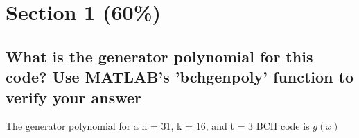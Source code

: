 \documentclass[a4paper]{report}
\begin{document}
\section*{Section 1 (60\%)}

\subsection*{What is the generator polynomial for this code? Use MATLAB’s ’bchgenpoly’ function to verify your answer}

The generator polynomial for a n = 31, k = 16, and t = 3 BCH code is $g(x)$
\end{document}
